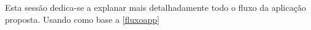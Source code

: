 Esta sessão dedica-se a explanar mais detalhadamente todo o fluxo da aplicação proposta. Usando como base a \autoref{fluxoapp}
